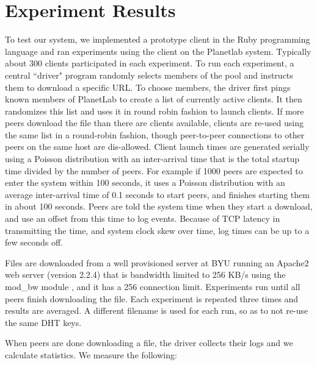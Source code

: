 
\chapter{Experiment Results}

To test our system, we implemented a prototype client in the Ruby programming language and 
ran experiments using the client on the Planetlab system.  Typically about 300 clients participated in each experiment.
To run each experiment, a central ``driver" program randomly selects members of the pool and instructs them to download a specific URL.  To
choose members, the driver first pings known members of PlanetLab to create a list of currently active clients.  
It then randomizes this list and uses it in round robin fashion to launch clients.  If more peers download the file than there are clients available, clients are re-used using the same list in a round-robin fashion, though peer-to-peer connections 
to other peers on the same host are dis-allowed. 
Client launch times are generated serially using a Poisson distribution with an inter-arrival time that is the total startup time
divided by the number of peers.  For example if 1000 peers are expected to enter the system within 100 seconds, it uses a Poisson distribution with 
an average inter-arrival time of 0.1 seconds to start peers, and finishes
starting them in about 100 seconds.  Peers are told the system time when they start a download, 
and use an offset from this time to log events.  Because of TCP latency in transmitting the time, and system clock skew over time, 
log times can be up to a few seconds off.

Files are downloaded from a well provisioned server at BYU running an Apache2 web server (version 2.2.4) that is
bandwidth limited to 256 KB/s using the mod\_bw module \cite{mod_bw}, and it has a 256 connection limit. 
Experiments run until all peers finish downloading the file. 
Each experiment is repeated three times and results are averaged.  A different filename is used for each run, so as to not re-use the same DHT keys.

When peers are done downloading a file, the driver collects their logs and we calculate statistics.  We measure 
the following:

